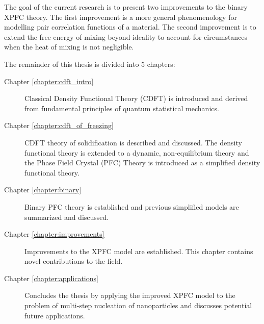 
The goal of the current research is to present two improvements to the
binary XPFC theory. The first improvement is a more general phenomenology
for modelling pair correlation functions of a material. The second 
improvement is to extend the free energy of mixing beyond ideality to 
account for circumstances when the heat of mixing is not negligible.


The remainder of this thesis is divided into 5 chapters:
%
\begin{description}
    \item [Chapter \ref{chapter:cdft_intro}] { Classical Density Functional
        Theory (CDFT) is introduced and derived from fundamental principles of
        quantum statistical mechanics.
    }
    \item [Chapter \ref{chapter:cdft_of_freezing}] { CDFT theory of
        solidification is described and discussed. The density functional
        theory is extended to a dynamic, non-equilibrium theory and the Phase
        Field Crystal (PFC) Theory is introduced as a simplified density
        functional theory.
    }
    \item [Chapter \ref{chapter:binary}] { Binary PFC theory is established and
        previous simplified models are summarized and discussed.
    }
    \item [Chapter \ref{chapter:improvements}] { Improvements to the XPFC model
        are established. This chapter contains novel contributions to the field.
    }
    \item [Chapter \ref{chapter:applications}] { Concludes the thesis by
        applying the improved XPFC model to the problem of multi-step nucleation
        of nanoparticles and discusses potential future applications.
    } 
\end{description}
%
